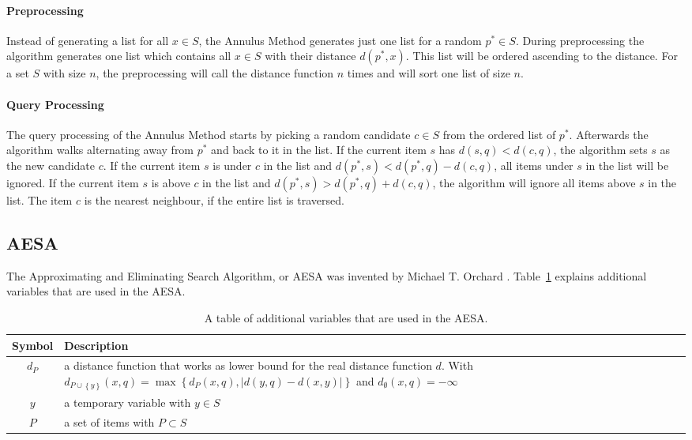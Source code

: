 \documentclass[runningheads,a4paper]{llncs}
\begin{document}
\paragraph{Preprocessing}

Instead of generating a list for all $x \in S$, the Annulus Method generates just one list for a random $p^* \in S$.
During preprocessing the algorithm generates one list which contains all $x \in S$ with their distance $d(p^*, x)$. This
list will be ordered ascending to the distance. For a set $S$ with size $n$, the preprocessing will call the distance
function $n$ times and will sort one list of size $n$.

\paragraph{Query Processing}

The query processing of the Annulus Method starts by picking a random candidate $c \in S$ from the ordered list of
$p^*$. Afterwards the algorithm walks alternating away from $p^*$ and back to it in the list. If the current item $s$
has $d(s, q) < d(c, q)$, the algorithm sets $s$ as the new candidate $c$. If the current item $s$ is under $c$ in the
list and $d(p^*, s) < d(p^*, q) - d(c, q)$, all items under $s$ in the list will be ignored. If the current
item $s$ is above $c$ in the list and $d(p^*, s) > d(p^*, q) + d(c, q)$, the algorithm will ignore all items above
$s$ in the list. The item $c$ is the nearest neighbour, if the entire list is traversed.

\subsection{AESA}

The Approximating and Eliminating Search Algorithm, or AESA was invented by Michael T. Orchard \cite{Ruiz}.
Table~\ref{tab:notation:aesa} explains additional variables that are used in the AESA.

\begin{table}[H]
	\begin{center}
		\begin{tabularx}{\textwidth}{c X}
			\textbf{Symbol} & \textbf{Description}\\
			\hline
			$d_P$ & a distance function that works as lower bound for the real distance function $d$.
				With $d_{P \cup \left\{ {y}\right\}}(x, q) = \max\left\{ {d_P(x, q), |d(y, q) - d(x, y)|}\right\}$ and
				$d_{\emptyset}(x, q) = -\infty$\\
			$y$ & a temporary variable with $y \in S$\\
			$P$ & a set of items with $P \subset S$
		\end{tabularx}
	\end{center}
	\caption{A table of additional variables that are used in the AESA.}
	\label{tab:notation:aesa}
\end{table}
\end{document}
